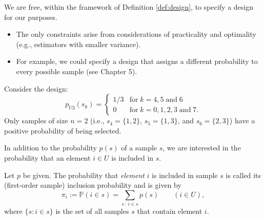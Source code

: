 \documentclass{my_eth_beamer}
\numberwithin{equation}{section}
\begin{document}
\begin{frame}
    \alert{We} are \alert{free}, within the framework of Definition
    \ref{def:design}, to specify a design for our purposes.
    \begin{itemize}
    \setlength{\itemsep}{4pt}
        \item The only \alert{constraints} arise from considerations of
            \alert{practicality} and \alert{optimality} (e.g., estimators
            with smaller variance).
        \item For example, we could specify a design that assigns a different
            probability to every possible sample (see Chapter 5).
    \end{itemize}
    \begin{Bsp}\label{ex:basics_u3_2}
        \vspace{-0.5em}
        Consider the design:
        \vspace{-1.5em}
        \begin{equation*}
            p_{U3}(s_k) = \begin{cases}
                    1/3 & \text{for} \; k = 4, 5 \;\text{and} \; 6\\
                    0 & \text{for} \; k = 0, 1, 2, 3 \; \text{and} \; 7.
                \end{cases}
        \end{equation*}
        \noindent Only samples of size $n = 2$ (i.e., $s_4 = \{1, 2\}$,
        $s_5 = \{1, 3\}$, and $s_6 = \{2, 3\}$) have a positive probability
        of being selected.
    \end{Bsp}
\end{frame}

\setcounter{Bsp}{\the\numexpr\value{Bsp}+1\relax}

\begin{frame}
    In addition to the probability $p(s)$ of a sample $s$, we are interested
    in the probability that an \alert{element} $i \in U$ is included in $s$.

    \vspace{0.5em}

    \begin{Def}\label{def:inclusionprobabilities}
        \vspace{-0.5em}
        Let $p$ be given. The probability that \emph{element} $i$ is included
        in sample $s$ is called its (first-order sample) \alert{inclusion
        probability} and is given by
        \begin{equation*}
            \pi_i := \mathbb{P}(i \in s) = \sum_{s \, : \, i \in s} p(s)
                \qquad (i \in U),
        \end{equation*}
        where $\{s: i \in s\}$ is the set of all samples $s$ that contain
        element $i$.
    \end{Def}
\end{frame}
\end{document}
